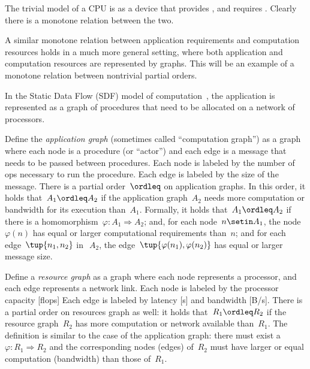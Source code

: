 The trivial model of a CPU is as a device that provides , and requires .
Clearly there is a monotone relation between the two.

\begin{figure}[h!]
    \centering
    \caption{}
\end{figure}

A similar monotone relation between application requirements and computation resources holds in a much more general setting, where both application and computation resources are represented by graphs.
This will be an example of a monotone relation between nontrivial partial orders.

In the Static Data Flow (SDF) model of computation~\cite[Chapter 3]{sriram00,lee10}, the application is represented as a graph of procedures that need to be allocated on a network of processors.

\begin{figure*}[h!]
    \centering
    \caption{}
\end{figure*}

Define the\emph{ application graph }(sometimes called ``computation graph'') as a graph where each node is a procedure (or ``actor'') and each edge is a message that needs to be passed between procedures.
Each node is labeled by the number of ops necessary to run the procedure.
Each edge is labeled by the size of the message.
There is a partial order~$\ordleq$ on application graphs.
In this order, it holds that~$A_1 \ordleq A_2$ if the application graph~$A_2$ needs more computation or bandwidth for its execution than~$A_1$.
Formally, it holds that~$A_1 \ordleq A_2$
if there is a homomorphism~$\varphi \colon A_1 \Rightarrow A_2$; and, for each node~$n \setin A_1$, the node~$\varphi(n)$ has equal or larger computational requirements than~$n$; and for each edge~$\tup{n_1,n_2}$
in~$~A_2$, the edge~$\tup{\varphi (n_1), \varphi (n_2)}$ has equal or larger message size.

Define a \emph{resource graph} as a graph where each node represents a processor, and each edge represents a network link.
Each node is labeled by the processor capacity [flops] Each edge is labeled by latency [s] and bandwidth [B/s].
There is a partial order on resources graph as well: it holds that~$R_1 \ordleq R_2$ if the resource graph~$R_2$ has more computation or network available than~$R_1$.
The definition is similar to the case of the application graph: there must exist a ~$\varphi \colon R_1 \Rightarrow R_2$
and the corresponding nodes (edges) of~$R_2$ must have larger or equal computation (bandwidth) than those of~$R_1$.

